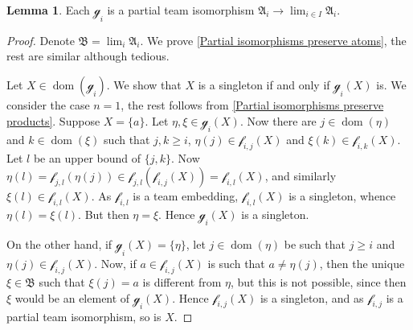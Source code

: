 \documentclass[a4paper]{amsart}
\theoremstyle{definition}
\newtheorem{lemma}[definition]{Lemma}
\theoremstyle{remark}
\newcommand{\A}{\mathcal{A}}
\newcommand{\B}{\mathcal{B}}
\DeclareMathOperator{\dom}{dom}
\theoremstyle{definition}
\renewcommand{\A}{\mathfrak{A}}
\renewcommand{\B}{\mathfrak{B}}
\newcommand{\f}{\mathcal{f}}
\newcommand{\g}{\mathcal{g}}
\begin{document}
\begin{lemma}\label{Limit maps are embeddings}
    Each $\g_i$ is a partial team isomorphism $\A_i\to\lim_{i\in I}\A_i$.
\end{lemma}
\begin{proof}
    Denote $\B=\lim_i\A_i$.
    We prove \ref{Partial isomorphisms preserve atoms}, the rest are similar although tedious.

    Let $X\in\dom(\g_i)$. We show that $X$ is a singleton if and only if $\g_i(X)$ is. We consider the case $n=1$, the rest follows from \ref{Partial isomorphisms preserve products}. Suppose $X = \{a\}$. Let $\eta,\xi\in\g_i(X)$. Now there are $j\in\dom(\eta)$ and $k\in\dom(\xi)$ such that $j,k\geq i$, $\eta(j)\in\f_{i,j}(X)$ and $\xi(k)\in\f_{i,k}(X)$. Let $l$ be an upper bound of $\{j,k\}$. Now $\eta(l) = \f_{j,l}(\eta(j))\in \f_{j,l}(\f_{i,j}(X)) = \f_{i,l}(X)$, and similarly $\xi(l)\in\f_{i,l}(X)$. As $\f_{i,l}$ is a team embedding, $\f_{i,l}(X)$ is a singleton, whence $\eta(l)=\xi(l)$. But then $\eta = \xi$. Hence $\g_i(X)$ is a singleton.

    On the other hand, if $\g_i(X) = \{\eta\}$, let $j\in\dom(\eta)$ be such that $j\geq i$ and $\eta(j)\in\f_{i,j}(X)$. Now, if $a\in\f_{i,j}(X)$ is such that $a\neq\eta(j)$, then the unique $\xi\in\B$ such that $\xi(j) = a$ is different from $\eta$, but this is not possible, since then $\xi$ would be an element of $\g_i(X)$. Hence $\f_{i,j}(X)$ is a singleton, and as $\f_{i,j}$ is a partial team isomorphism, so is $X$.
\end{proof}
\end{document}
